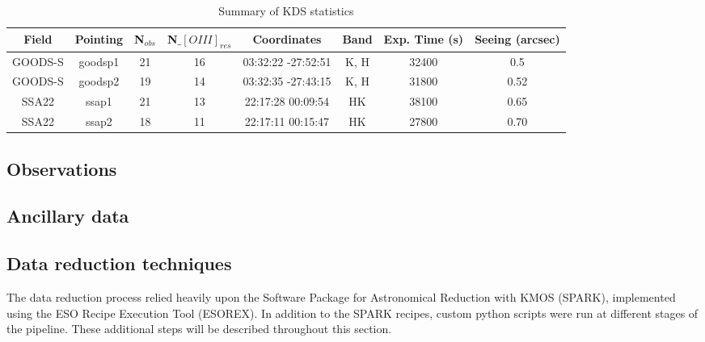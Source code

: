 \documentclass[a4paper,fleqn,usenatbib]{mn2e}
\begin{document}
\begin{table*}\label{tab:pointings}
    \centering
\begin{tabular}{ c c c c c c c c }

 \hline
Field & Pointing & N$_{obs}$ & N$\_[OIII]_{res}$ & Coordinates & Band & Exp. Time (s) & Seeing (arcsec)  \\
 \hline
 GOODS-S & goodsp1 & 21 & 16 & 03:32:22 -27:52:51 & K, H & 32400 & 0.5 \\
GOODS-S & goodsp2 & 19 & 14 & 03:32:35 -27:43:15 & K, H & 31800 & 0.52 \\
SSA22 & ssap1 & 21 & 13 & 22:17:28 00:09:54 & HK & 38100 & 0.65 \\
SSA22 & ssap2 & 18 & 11 & 22:17:11 00:15:47 & HK & 27800 & 0.70 \\
 \hline
\end{tabular}
\caption{Summary of KDS statistics}
\end{table*}

\subsection{Observations}

\subsection{Ancillary data}

\subsection{Data reduction techniques}
The data reduction process relied heavily upon the Software Package for Astronomical Reduction with KMOS (SPARK), implemented using the ESO Recipe Execution Tool (ESOREX).
In addition to the SPARK recipes, custom python scripts were run at different stages of the pipeline.
These additional steps will be described throughout this section.
\end{document}
